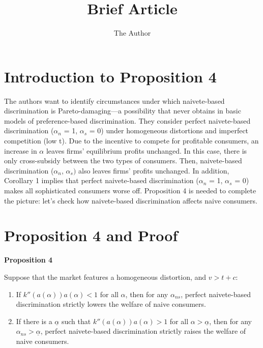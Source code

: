 \documentclass[12pt, oneside]{article}   	%
\title{Brief Article}
\author{The Author}
\begin{document}

\section*{Introduction to Proposition 4}
The authors want to identify circumstances under which naivete-based discrimination is Pareto-damaging—a possibility that never obtains in basic models of preference-based discrimination. They consider perfect naivete-based discrimination (\( \alpha_{n} \) = 1, \( \alpha_{s} \) = 0) under homogeneous distortions and imperfect competition (low t). Due to the incentive to compete for profitable consumers, an increase in \( \alpha \) leaves firms’ equilibrium profits unchanged. In this case, there is only cross-subsidy between the two types of consumers. Then, naivete-based discrimination (\(\alpha_{n} \), \( \alpha_{s}) \) also leaves firms’ profits unchanged. In addition, Corollary 1 implies that perfect naivete-based discrimination (\( \alpha_{n} \) = 1, \( \alpha_{s} \) = 0) makes all sophisticated consumers worse off. Proposition 4 is needed to complete the picture: let's check how naivete-based discrimination affects naive consumers.

\section*{Proposition 4 and Proof}

\textbf{Proposition 4}  

Suppose that the market features a homogeneous distortion, and \( v > t + c \):  
\begin{enumerate}
    \item If \( k''(a(\alpha))a(\alpha) < 1 \) for all \( \alpha \), then for any \( \alpha_{ns} \), perfect naivete-based discrimination strictly lowers the welfare of naive consumers.
    \item If there is a \( \underline{\alpha}  \) such that \( k''(a(\alpha))a(\alpha) > 1 \) for all \( \alpha > \underline{\alpha} \), then for any \( \alpha_{ns} > \underline{\alpha} \), perfect naivete-based discrimination strictly raises the welfare of naive consumers.
\end{enumerate}
\end{document}
